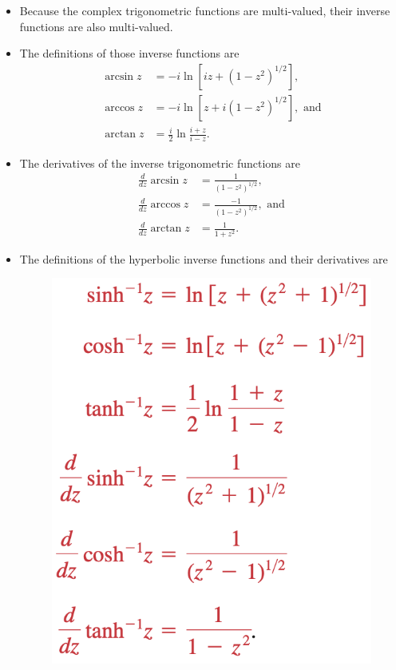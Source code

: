 \documentclass{article}
\begin{document}
\begin{itemize}
  \item Because the complex trigonometric functions are multi-valued, their inverse functions are also multi-valued.

  \item The definitions of those inverse functions are \begin{align*}
          \arcsin z & = -i \ln [i z + (1 - z^2)^{1 / 2}],             \\
          \arccos z & = -i \ln [z + i (1 - z^2)^{1 / 2}], \text{ and} \\
          \arctan z & = \frac{i}{2} \ln \frac{i + z}{i - z}.
        \end{align*}

  \item The derivatives of the inverse trigonometric functions are \begin{align*}
          \frac{d}{d z} \arcsin z & = \frac{1}{(1 - z^2)^{1 / 2}},              \\
          \frac{d}{d z} \arccos z & = \frac{-1}{(1 - z^2)^{1 / 2}}, \text{ and} \\
          \frac{d}{d z} \arctan z & = \frac{1}{1 + z^2}.
        \end{align*}

  \item The definitions of the hyperbolic inverse functions and their derivatives are

        \begin{figure}[H]
          \centering
          \includegraphics[width=0.4 \textwidth]{inverse-hyperbolic-functions}
        \end{figure}
\end{itemize}
\end{document}
